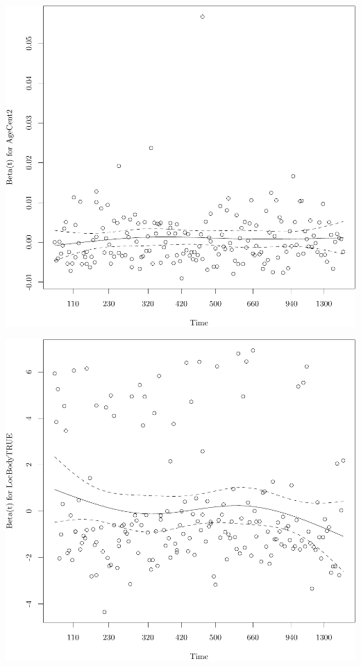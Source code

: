 \documentclass{article}\usepackage[]{graphicx}\usepackage[]{color}
\makeatletter
\def\maxwidth{ %
  \ifdim\Gin@nat@width>\linewidth
    \linewidth
  \else
    \Gin@nat@width
  \fi
}
\newenvironment{knitrout}{}{} %
\makeatother
\begin{document}
\begin{knitrout}
{}




{\centering \includegraphics[width=\maxwidth]{figure/05-eda-ph-check-full-3-2} 

}




{\centering \includegraphics[width=\maxwidth]{figure/05-eda-ph-check-full-3-3} 

}
\end{knitrout}
\end{document}
